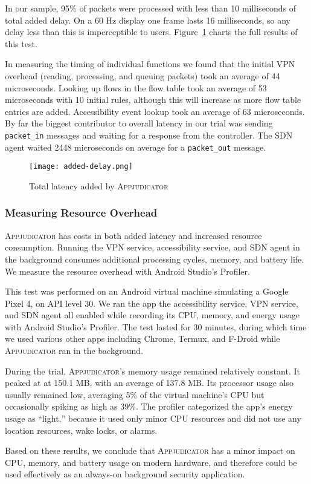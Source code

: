 In our sample, 95\% of packets were processed with less than 10 milliseconds
of total added delay. On a 60 Hz display one frame lasts 16 milliseconds, so any
delay less than this is imperceptible to users.
Figure~\ref{fig:added-delay-chart} charts the full results of this test.

In measuring the timing of individual functions we found that the initial VPN
overhead (reading, processing, and queuing packets) took an average of 44
microseconds. Looking up flows in the flow table took an average of 53
microseconds with 10 initial rules, although this will increase as more flow
table entries are added. Accessibility event lookup took an average of 63
microseconds. By far the biggest contributor to overall latency in our trial was
sending \texttt{packet\_in} messages and waiting for a response from the
controller. The SDN agent waited 2448 microseconds on average for a
\texttt{packet\_out} message.

\begin{figure}[h]
    \centering
	\texttt{[image: added-delay.png]}
	\caption{Total latency added by \textsc{Appjudicator}}
	\label{fig:added-delay-chart}
\end{figure}

\subsubsection{Measuring Resource Overhead}
\label{sec:measuring-resource-overhead}

\textsc{Appjudicator} has costs in both added latency and increased resource
consumption. Running the VPN service, accessibility service, and SDN agent in
the background consumes additional processing cycles, memory, and battery life.
We measure the resource overhead with Android Studio's
Profiler.~\cite{androidprofiler}

This test was performed on an Android virtual machine simulating a Google Pixel
4, on API level 30. We ran the app the accessibility service, VPN service, and
SDN agent all enabled while recording its CPU, memory, and energy usage with
Android Studio's Profiler. The test lasted for 30 minutes, during which time we
used various other apps including Chrome, Termux, and F-Droid while
\textsc{Appjudicator} ran in the background.

During the trial, \textsc{Appjudicator}'s memory usage remained relatively
constant. It peaked at at 150.1 MB, with an average of 137.8 MB. Its processor
usage also usually remained low, averaging 5\% of the virtual machine's CPU but
occasionally spiking as high as 39\%. The profiler categorized the app's energy
usage as ``light,'' because it used only minor CPU resources and did not use any
location resources, wake locks, or alarms.

Based on these results, we conclude that \textsc{Appjudicator} has a minor
impact on CPU, memory, and battery usage on modern hardware, and therefore could
be used effectively as an always-on background security application.

\newpage

